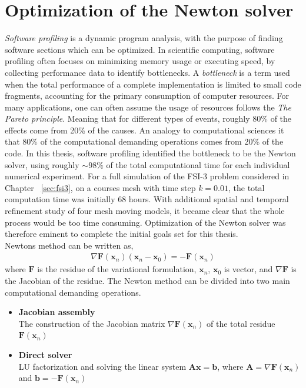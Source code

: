 \section{Optimization of the Newton solver}
\label{sec:opti}
\textit{Software profiling} is a dynamic program analysis, with the purpose of finding software sections which can be optimized. In scientific computing, software profiling often focuses on minimizing memory usage or executing speed, by collecting performance data to identify bottlenecks. A \textit{bottleneck} is a term used when the total performance of a complete implementation is limited to small code fragments, accounting for the primary consumption of computer resources. For many applications, one can often assume the usage of resources follows the \textit{The Pareto principle}. Meaning that for different types of events, roughly 80\% of the effects come from 20\% of the causes. An analogy to computational sciences it that 80\% of the computational demanding operations comes from 20\% of the code. In this thesis, software profiling identified the bottleneck to be the Newton solver, using roughly $\sim 98 \%$ of the total computational time for each individual numerical experiment. For a full simulation of the FSI-3 problem considered in Chapter ~\ref{sec:fsi3}, on a courses mesh with time step $k = 0.01$, the total computation time was initially 68 hours. With additional spatial and temporal refinement study of four mesh moving models, it became clear that the whole process would be too time consuming. Optimization of the Newton solver was therefore eminent to complete the initial goals set for this thesis. \\
Newtons method can be written as,
\begin{align}
\nabla \mathbf{F}(\mathbf{x}_n)(\mathbf{x}_n - \mathbf{x}_0) = - \mathbf{F}(\mathbf{x}_n)
\label{eq:newton}
\end{align}
where $\mathbf{F}$ is the residue of the variational formulation, $\mathbf{x}_n$, $\mathbf{x}_0$ is vector, and $ \nabla \mathbf{F}$ is the Jacobian of the residue. The Newton method can be divided into two main computational demanding operations.
\begin{itemize}
\item \textbf{Jacobian assembly} \\
The construction of the Jacobian matrix $\nabla \mathbf{F}(\mathbf{x}_n)$ of the total residue $\mathbf{F}(\mathbf{x}_n)$
\item \textbf{Direct solver} \\ 
LU factorization and solving the linear system $\mathbf{Ax} = \mathbf{b}$, where $\mathbf{A} = \nabla \mathbf{F}(\mathbf{x}_n)$ and $\mathbf{b} = - \mathbf{F}(\mathbf{x}_n) $
\end{itemize}
